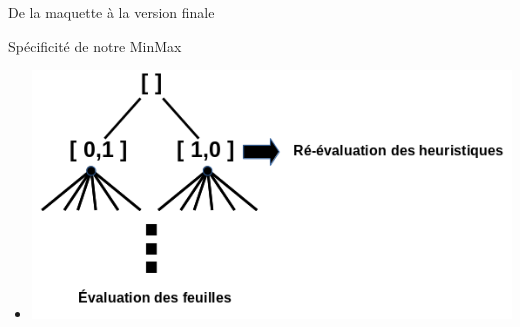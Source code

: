 \documentclass{beamer}
\begin{document}
\begin{frame}{De la maquette à la version finale}
\begin{frame}{}
\begin{block}{Spécificité de notre MinMax}
\begin{itemize}
 \item{
  \includegraphics[scale=0.4]{IA4}}
\end{itemize}
\end{block}
\end{frame}



\end{frame}
\end{document}
